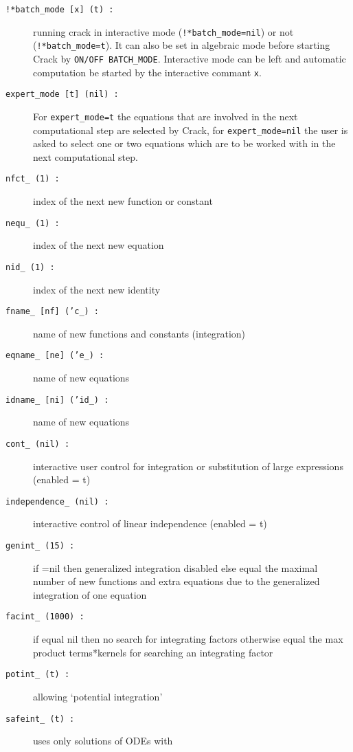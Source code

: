 \documentclass[12pt]{article}
\begin{document}
\begin{description}    
\item[{\tt !*batch\_mode [x] (t) :}] running crack in interactive mode
({\tt !*batch\_mode=nil}) or not ({\tt !*batch\_mode=t}). It can also be 
set in algebraic mode before starting {\sc Crack}
by {\tt ON/OFF BATCH\_MODE}. Interactive mode can be left and automatic
computation be started by the interactive commant {\tt x}.
\item[{\tt expert\_mode [t] (nil) :}] For {\tt expert\_mode=t} the
equations that are involved in the next computational step are
selected by {\sc Crack}, for {\tt expert\_mode=nil} the user is asked
to select one or two equations which are to be worked with in the next
computational step. 
\item[{\tt nfct\_ (1) :}] index of the next new function or constant
\item[{\tt nequ\_ (1) :}] index of the next new equation
\item[{\tt nid\_ (1) :}] index of the next new identity
\item[{\tt fname\_ [nf] ('c\_) :}] name of new functions and constants
                                   (integration)
\item[{\tt eqname\_ [ne] ('e\_) :}] name of new equations
\item[{\tt idname\_ [ni] ('id\_) :}] name of new equations
\item[{\tt cont\_ (nil) :}] interactive user control for integration
 or substitution of large expressions (enabled = t)
\item[{\tt independence\_ (nil) :}] interactive control of linear 
                                    independence (enabled = t)
\item[{\tt genint\_ (15) :}]  if =nil then generalized integration disabled
                    else equal the maximal number of new functions and extra
                    equations due to the generalized integration of
                    one equation  
\item[{\tt facint\_ (1000) :}] if equal nil then no search for
                    integrating factors otherwise equal the  max
                    product terms*kernels for searching an integrating
                    factor
\item[{\tt potint\_ (t) :}] allowing `potential integration'
\item[{\tt safeint\_ (t) :}] uses only solutions of ODEs with

\end{description}
\end{document}

